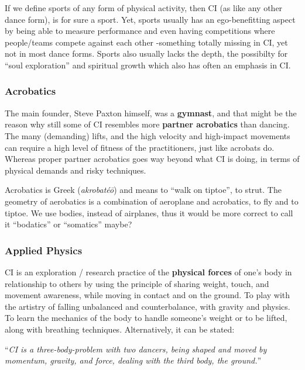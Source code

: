 If we define sports of any form of physical activity, then CI (as like any other dance form), is for sure a sport.
Yet, sports usually has an ego-benefitting aspect by being able to measure performance and even having competitions where people/teams compete against each other -something totally missing in CI, yet not in most dance forms.
Sports also usually lacks the depth, the possibilty for ``soul exploration'' and spiritual growth which also has often an emphasis in CI.

\subsubsection{Acrobatics}

The main founder, Steve Paxton himself, was a \textbf{gymnast}, and that might be the reason why still some of CI resembles more \textbf{partner acrobatics} than dancing.
The many (demanding) lifts, and the high velocity and high-impact movements can require a high level of fitness of the practitioners, just like acrobats do.
Whereas proper partner acrobatics goes way beyond what CI is doing, in terms of physical demands and risky techniques.

Acrobatics is Greek (\textit{akrobatéō}) and means to ``walk on tiptoe'', to strut.
The geometry of aerobatics is a combination of aeroplane and acrobatics, to fly and to tiptoe.
We use bodies, instead of airplanes, thus it would be more correct to call it ``bodatics'' or ``somatics'' maybe?

\subsubsection{Applied Physics}

CI is an exploration / research practice of the \textbf{physical forces} of one's body in relationship to others by using the principle of sharing weight, touch, and movement awareness, while moving in contact and on the ground.
To play with the artistry of falling unbalanced and counterbalance, with gravity and physics.
To learn the mechanics of the body to handle someone's weight or to be lifted, along with breathing techniques.
Alternatively, it can be stated:

\begin{center}
    ``\textit{CI is a three-body-problem with two dancers, being shaped and moved by momentum, gravity, and force, dealing with the third body, the ground.}''
\end{center}

